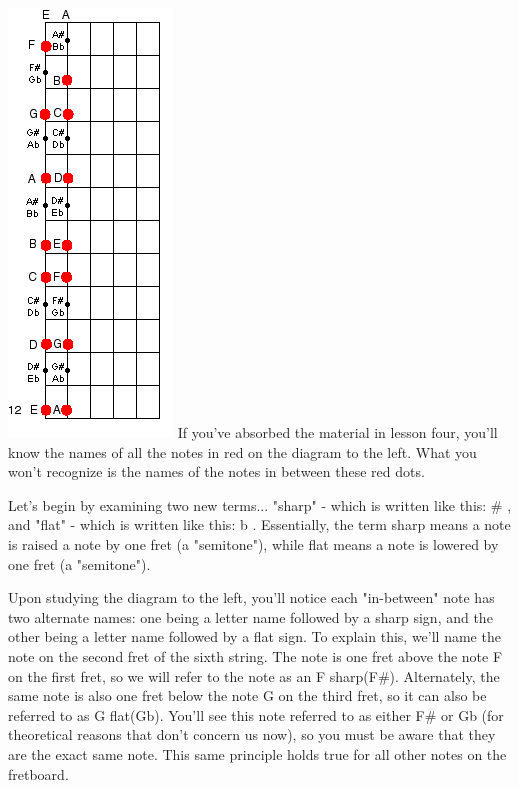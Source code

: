 \includegraphics{partfive/fretboard_full.png}
If you've absorbed the material in lesson four, you'll know the names of all the notes in red on the diagram to the left. What you won't recognize is the names of the notes in between these red dots.

Let's begin by examining two new terms... "sharp" - which is written like this: \# , and "flat" - which is written like this: b . Essentially, the term sharp means a note is raised a note by one fret (a "semitone"), while flat means a note is lowered by one fret (a "semitone").

Upon studying the diagram to the left, you'll notice each "in-between" note has two alternate names: one being a letter name followed by a sharp sign, and the other being a letter name followed by a flat sign. To explain this, we'll name the note on the second fret of the sixth string. The note is one fret above the note F on the first fret, so we will refer to the note as an F sharp(F\#). Alternately, the same note is also one fret below the note G on the third fret, so it can also be referred to as G flat(Gb). You'll see this note referred to as either F\# or Gb (for theoretical reasons that don't concern us now), so you must be aware that they are the exact same note. This same principle holds true for all other notes on the fretboard. 

